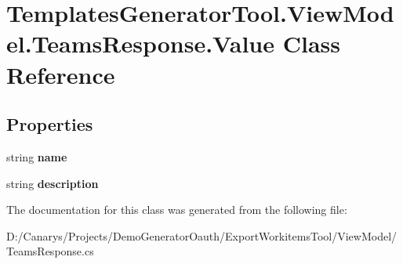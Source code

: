 \hypertarget{class_templates_generator_tool_1_1_view_model_1_1_teams_response_1_1_value}{}\section{Templates\+Generator\+Tool.\+View\+Model.\+Teams\+Response.\+Value Class Reference}
\label{class_templates_generator_tool_1_1_view_model_1_1_teams_response_1_1_value}
\subsection*{Properties}
\begin{DoxyCompactItemize}
\item 
\mbox{\label{class_templates_generator_tool_1_1_view_model_1_1_teams_response_1_1_value_a65bc346e80fb6ab81a248cda3f10edd8}} 
string {\bfseries name}
\item 
\mbox{\label{class_templates_generator_tool_1_1_view_model_1_1_teams_response_1_1_value_a4d4c214685f06bf31f1ad04ac0bcc2ac}} 
string {\bfseries description}
\end{DoxyCompactItemize}


The documentation for this class was generated from the following file\+:\begin{DoxyCompactItemize}
\item 
D\+:/\+Canarys/\+Projects/\+Demo\+Generator\+Oauth/\+Export\+Workitems\+Tool/\+View\+Model/Teams\+Response.\+cs\end{DoxyCompactItemize}
